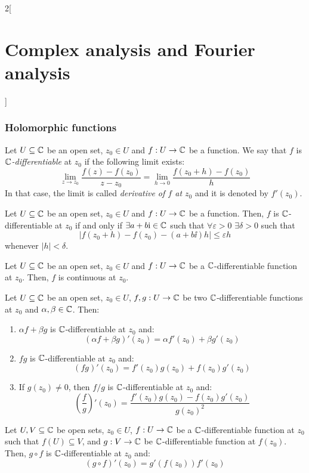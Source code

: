 \documentclass[../../../main.tex]{subfiles}
\begin{document}
\begin{multicols}{2}[\section{Complex analysis and Fourier analysis}]
  \subsubsection{Holomorphic functions}
  \begin{definition}
    Let $U\subseteq \mathbb{C}$ be an open set, $z_0\in U$ and $f:U\rightarrow \mathbb{C}$ be a function. We say that $f$ is \emph{$\mathbb{C}$-differentiable} at $z_0$ if the following limit exists: $$\lim_{z \to z_0} \frac{f(z) - f(z_0)}{z - z_0} = \lim_{h \to 0} \frac{f(z_0 + h) - f(z_0)}{h}$$ In that case, the limit is called \textit{derivative of $f$ at $z_0$} and it is denoted by $f'(z_0)$.
  \end{definition}
  \begin{proposition}
    Let $U\subseteq \mathbb{C}$ be an open set, $z_0\in U$ and $f:U\rightarrow \mathbb{C}$ be a function. Then, $f$ is $\mathbb{C}$-differentiable at $z_0$ if and only if $\exists a+b\mathrm{i}\in\mathbb{C}$ such that $\forall\varepsilon>0$ $\exists\delta>0$ such that $$|f(z_0+h)-f(z_0)-(a+b\ii)h|\leq \varepsilon h$$ whenever $|h|<\delta$.
  \end{proposition}
  \begin{proposition}
    Let $U\subseteq \mathbb{C}$ be an open set, $z_0 \in U$ and $f:U\rightarrow \mathbb{C}$ be a $\mathbb{C}$-differentiable function at $z_0$. Then, $f$ is continuous at $z_0$.
  \end{proposition}
  \begin{proposition}
    Let $U\subseteq \mathbb{C}$ be an open set, $z_0 \in U$, $f,g:U\rightarrow \mathbb{C}$ be two $\mathbb{C}$-differentiable functions at $z_0$ and $\alpha,\beta\in \mathbb{C}$. Then:
    \begin{enumerate}
      \item $\alpha f + \beta g$ is $\mathbb{C}$-differentiable at $z_0$ and: $${(\alpha f+ \beta g)}'(z_0) = \alpha f'(z_0) + \beta g'(z_0)$$
      \item $fg$ is $\mathbb{C}$-differentiable at $z_0$ and: $${(fg)}'(z_0) = f'(z_0)g(z_0) + f(z_0)g'(z_0)$$
      \item If $g(z_0) \neq 0$, then $f/g$ is $\mathbb{C}$-differentiable at $z_0$ and:
            $${\left(\frac{f}{g}\right)}'(z_0) = \frac{f'(z_0)g(z_0) - f(z_0) g'(z_0)}{{g(z_0)}^2}$$
    \end{enumerate}
  \end{proposition}
  \begin{theorem}
    Let $U,V\subseteq \mathbb{C}$ be open sets, $z_0\in U$, $f:U\rightarrow\mathbb{C}$ be a $\mathbb{C}$-differentiable function at $z_0$ such that $f(U)\subseteq V$, and $g:V\rightarrow\mathbb{C}$ be $\mathbb{C}$-differentiable function at $f(z_0)$. Then, $g\circ f$ is $\mathbb{C}$-differentiable at $z_0$ and: $${(g\circ f)}'(z_0)=g'(f(z_0))f'(z_0)$$

\end{theorem}
\end{multicols}
\end{document}
